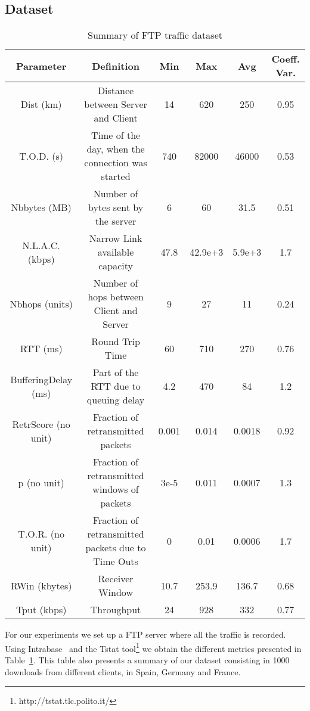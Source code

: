 \documentclass[]{algotel}
\begin{document}
\subsection{Dataset}
\begin{table}[t]
 \centering
 \small{
 \begin{tabular}{|c|c|c|c|c|c|}
    \hline
    \textbf{Parameter} & \textbf{Definition} & \textbf{Min} & \textbf{Max} & \textbf{Avg} & \textbf{Coeff. Var.}\\
    \hline
    Dist (km) & Distance between Server and Client & 14 & 620 & 250 & 0.95\\
    T.O.D. (s) & Time of the day, when the connection was started & 740 & 82000 & 46000 & 0.53\\
    Nbbytes (MB) & Number of bytes sent by the server & 6 & 60 & 31.5 & 0.51\\
    N.L.A.C. (kbps) & Narrow Link available capacity & 47.8 & 42.9e+3 & 5.9e+3 & 1.7\\
    Nbhops (units) & Number of hops between Client and Server & 9 & 27 & 11 & 0.24\\
    RTT (ms) & Round Trip Time & 60 & 710 & 270 & 0.76\\
    BufferingDelay (ms) & Part of the RTT due to queuing delay & 4.2 & 470 & 84 & 1.2\\
    RetrScore (no unit) & Fraction of retransmitted packets & 0.001 & 0.014 & 0.0018 & 0.92\\
    p (no unit) & Fraction of retransmitted windows of packets & 3e-5 & 0.011 & 0.0007 & 1.3\\
    T.O.R. (no unit) & Fraction of retransmitted packets due to Time Outs & 0 & 0.01 & 0.0006 & 1.7\\
    RWin (kbytes) & Receiver Window & 10.7 & 253.9 & 136.7 & 0.68\\
    Tput (kbps) & Throughput & 24 & 928 & 332 & 0.77\\
    \hline
 \end{tabular}}
  \caption{Summary of FTP traffic dataset}
  \label{tab:ds}
\end{table}

For our experiments we set up a FTP server where all the traffic is recorded. Using Intrabase~\cite{conf/e2emon/SiekkinenBUGP05} and the Tstat tool\footnote{http://tstat.tlc.polito.it/} we obtain the different metrics presented in Table~\ref{tab:ds}. This table also presents a summary of our dataset consisting in 1000 downloads from different clients, in Spain, Germany and France.
\end{document}
